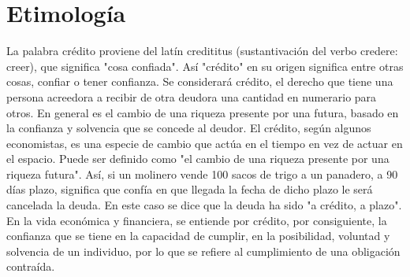 \section{Etimología}

La palabra crédito proviene del latín credititus (sustantivación del verbo credere: creer), que significa "cosa confiada". Así "crédito" en su origen significa entre otras cosas, confiar o tener confianza. Se considerará crédito, el derecho que tiene una persona acreedora a recibir de otra deudora una cantidad en numerario para otros. En general es el cambio de una riqueza presente por una futura, basado en la confianza y solvencia que se concede al deudor. El crédito, según algunos economistas, es una especie de cambio que actúa en el tiempo en vez de actuar en el espacio. Puede ser definido como "el cambio de una riqueza presente por una riqueza futura". Así, si un molinero vende 100 sacos de trigo a un panadero, a 90 días plazo, significa que confía en que llegada la fecha de dicho plazo le será cancelada la deuda. En este caso se dice que la deuda ha sido "a crédito, a plazo". En la vida económica y financiera, se entiende por crédito, por consiguiente, la confianza que se tiene en la capacidad de cumplir, en la posibilidad, voluntad y solvencia de un individuo, por lo que se refiere al cumplimiento de una obligación contraída.